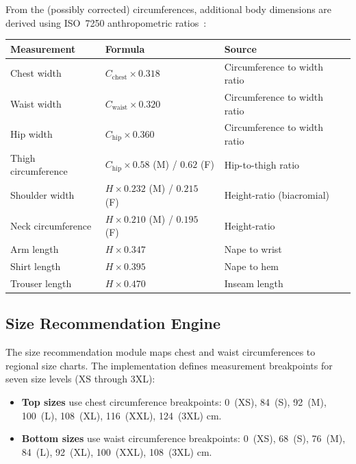 From the (possibly corrected) circumferences, additional body dimensions are derived using ISO~7250 anthropometric ratios~\cite{choutas2022shapy}:

\begin{longtable}{p{4cm} p{4cm} p{5.5cm}}
\toprule
\textbf{Measurement} & \textbf{Formula} & \textbf{Source} \\
\midrule
\endfirsthead
\endhead
\bottomrule
\endfoot

Chest width & $C_{\text{chest}} \times 0.318$ & Circumference to width ratio \\
Waist width & $C_{\text{waist}} \times 0.320$ & Circumference to width ratio \\
Hip width & $C_{\text{hip}} \times 0.360$ & Circumference to width ratio \\
Thigh circumference & $C_{\text{hip}} \times 0.58$ (M) / $0.62$ (F) & Hip-to-thigh ratio \\
Shoulder width & $H \times 0.232$ (M) / $0.215$ (F) & Height-ratio (biacromial) \\
Neck circumference & $H \times 0.210$ (M) / $0.195$ (F) & Height-ratio \\
Arm length & $H \times 0.347$ & Nape to wrist \\
Shirt length & $H \times 0.395$ & Nape to hem \\
Trouser length & $H \times 0.470$ & Inseam length \\
\end{longtable}
\label{tab:derived-measurements}

\subsection{Size Recommendation Engine}

The size recommendation module maps chest and waist circumferences to regional size charts. The implementation defines measurement breakpoints for seven size levels (XS through 3XL):

\begin{itemize}[leftmargin=*]
    \item \textbf{Top sizes} use chest circumference breakpoints: 0~(XS), 84~(S), 92~(M), 100~(L), 108~(XL), 116~(XXL), 124~(3XL) cm.
    \item \textbf{Bottom sizes} use waist circumference breakpoints: 0~(XS), 68~(S), 76~(M), 84~(L), 92~(XL), 100~(XXL), 108~(3XL) cm.
\end{itemize}

